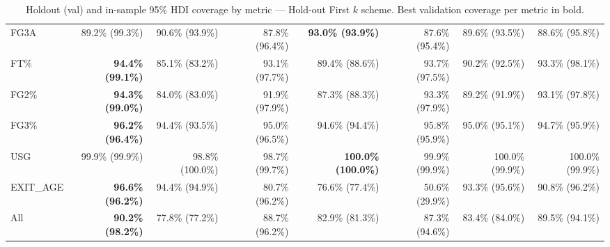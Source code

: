 \documentclass{article}
\begin{document}
\begin{table}[H]
{\begin{tabular}{lrrrrrrr}
FG3A & 89.2\% (99.3\%) & 90.6\% (93.9\%) & 87.8\% (96.4\%) & \textbf{93.0\% (93.9\%)} & 87.6\% (95.4\%) & 89.6\% (93.5\%) & 88.6\% (95.8\%) \\
FT\% & \textbf{94.4\% (99.1\%)} & 85.1\% (83.2\%) & 93.1\% (97.7\%) & 89.4\% (88.6\%) & 93.7\% (97.5\%) & 90.2\% (92.5\%) & 93.3\% (98.1\%) \\
FG2\% & \textbf{94.3\% (99.0\%)} & 84.0\% (83.0\%) & 91.9\% (97.9\%) & 87.3\% (88.3\%) & 93.3\% (97.9\%) & 89.2\% (91.9\%) & 93.1\% (97.8\%) \\
FG3\% & \textbf{96.2\% (96.4\%)} & 94.4\% (93.5\%) & 95.0\% (96.5\%) & 94.6\% (94.4\%) & 95.8\% (95.9\%) & 95.0\% (95.1\%) & 94.7\% (95.9\%) \\
USG & 99.9\% (99.9\%) & 98.8\% (100.0\%) & 98.7\% (99.7\%) & \textbf{100.0\% (100.0\%)} & 99.9\% (99.9\%) & 100.0\% (99.9\%) & 100.0\% (99.9\%) \\
EXIT\_AGE & \textbf{96.6\% (96.2\%)} & 94.4\% (94.9\%) & 80.7\% (96.2\%) & 76.6\% (77.4\%) & 50.6\% (29.9\%) & 93.3\% (95.6\%) & 90.8\% (96.2\%) \\
\midrule
All & \textbf{90.2\% (98.2\%)} & 77.8\% (77.2\%) & 88.7\% (96.2\%) & 82.9\% (81.3\%) & 87.3\% (94.6\%) & 83.4\% (84.0\%) & 89.5\% (94.1\%) \\
\bottomrule
\end{tabular}
}
\caption{Holdout (val) and in-sample 95\% HDI coverage by metric --- Hold-out First $k$ scheme. Best validation coverage per metric in bold.}
\label{tab:hdi_coverage_holdout_first_k}
\end{table}
\end{document}
